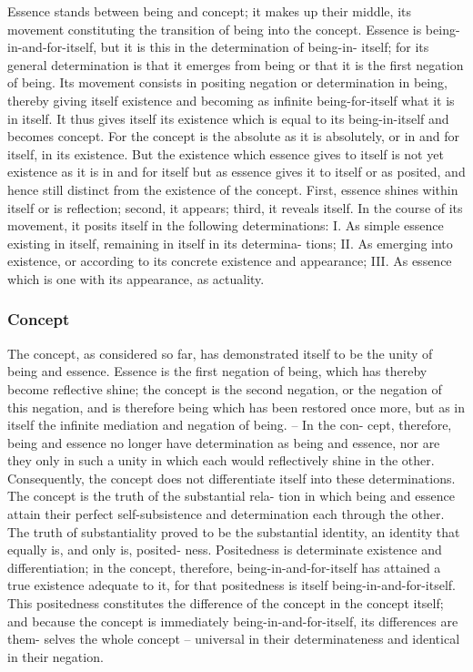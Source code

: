 \documentclass{article}
\begin{document}
Essence stands between being and concept; it makes up their middle, its
movement constituting the transition of being into the concept. Essence
is being-in-and-for-itself, but it is this in the determination of being-in-
itself; for its general determination is that it emerges from being or that
it is the first negation of being. Its movement consists in positing negation
or determination in being, thereby giving itself existence and becoming as
infinite being-for-itself what it is in itself. It thus gives itself its existence
which is equal to its being-in-itself and becomes concept. For the concept
is the absolute as it is absolutely, or in and for itself, in its existence. But
the existence which essence gives to itself is not yet existence as it is in and
for itself but as essence gives it to itself or as posited, and hence still distinct
from the existence of the concept.
First, essence shines within itself or is reflection; second, it appears; third, it
reveals itself. In the course of its movement, it posits itself in the following
determinations:
I. As simple essence existing in itself, remaining in itself in its determina-
tions;
II. As emerging into existence, or according to its concrete existence and
appearance;
III. As essence which is one with its appearance, as actuality.

\subsubsection{Concept}

The concept, as considered so far, has demonstrated itself to be the unity of
being and essence. Essence is the first negation of being, which has thereby
become reflective shine; the concept is the second negation, or the negation
of this negation, and is therefore being which has been restored once more,
but as in itself the infinite mediation and negation of being. – In the con-
cept, therefore, being and essence no longer have determination as being and
essence, nor are they only in such a unity in which each would reflectively
shine in the other. Consequently, the concept does not differentiate itself
into these determinations. The concept is the truth of the substantial rela-
tion in which being and essence attain their perfect self-subsistence and
determination each through the other. The truth of substantiality proved
to be the substantial identity, an identity that equally is, and only is, posited-
ness. Positedness is determinate existence and differentiation; in the concept,
therefore, being-in-and-for-itself has attained a true existence adequate to
it, for that positedness is itself being-in-and-for-itself. This positedness
constitutes the difference of the concept in the concept itself; and because
the concept is immediately being-in-and-for-itself, its differences are them-
selves the whole concept – universal in their determinateness and identical in
their negation.
\end{document}
